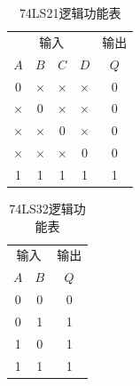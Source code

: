 \documentclass[12pt]{article}
\begin{document}
\begin{table}[h]
  \centering
  \caption{74LS21逻辑功能表}
    \begin{tabular}{cccc|c}
     \hline
      \multicolumn{4}{c|}{输入}& 输出 \\
    $A$  &$ B$  &$ C$  &$ D$  &$ Q$ \\
     \hline
    0  & $\times$ & $\times$ & $\times$ & 0 \\
    $\times$ & 0  & $\times$ & $\times$ & 0 \\
    $\times$ & $\times$ & 0  & $\times$ & 0 \\
    $\times$ & $\times$ & $\times$ & 0  & 0 \\
    1  & 1  & 1  & 1  & 1 \\
     \hline
    \end{tabular}%
  \label{tab7421}%
\end{table}%

\begin{table}[h]
  \centering
  \caption{74LS32逻辑功能表}
    \begin{tabular}{cc|c}
     \hline
     \multicolumn{2}{c|}{输入}& 输出 \\
    $A$ & $B$ & $Q$ \\
     \hline
    0  & 0  & 0 \\
    0  & 1  & 1 \\
    1  & 0  & 1 \\
    1  & 1  & 1 \\
     \hline
    \end{tabular}%
  \label{tab:7432}%
\end{table}%
\end{document}
